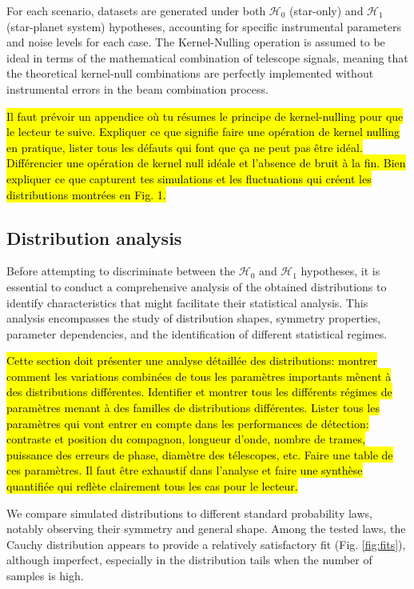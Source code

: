 \documentclass{article}
\begin{document}
For each scenario, datasets are generated under both ${\mathcal{H}}_0$ (star-only) and ${\mathcal{H}}_1$ (star-planet system) hypotheses, accounting for specific instrumental parameters and noise levels for each case. The Kernel-Nulling operation is assumed to be ideal in terms of the mathematical combination of telescope signals, meaning that the theoretical kernel-null combinations are perfectly implemented without instrumental errors in the beam combination process.

\hl{Il faut prévoir un appendice où tu résumes le principe de kernel-nulling pour que le lecteur te suive. Expliquer ce que signifie faire une opération de kernel nulling en pratique, lister tous les défauts qui font que ça ne peut pas être idéal. Différencier une opération de kernel null idéale et l'absence de bruit à la fin. Bien expliquer ce que capturent tes simulations et les fluctuations qui créent les distributions montrées en Fig. 1.}

\subsection{Distribution analysis}  \label{sec:distribution_analysis}

Before attempting to discriminate between the ${\mathcal{H}}_0$ and ${\mathcal{H}}_1$ hypotheses, it is essential to conduct a comprehensive analysis of the obtained distributions to identify characteristics that might facilitate their statistical analysis. This analysis encompasses the study of distribution shapes, symmetry properties, parameter dependencies, and the identification of different statistical regimes.

\hl{Cette section doit présenter une analyse détaillée des distributions: montrer comment les variations combinées de tous les paramètres importants mènent à des distributions différentes. Identifier et montrer tous les différents régimes de paramètres menant à des familles de distributions différentes. Lister tous les paramètres qui vont entrer en compte dans les performances de détection: contraste et position du compagnon, longueur d'onde, nombre de trames, puissance des erreurs de phase, diamètre des télescopes, etc. Faire une table de ces paramètres. Il faut être exhaustif dans l'analyse et faire une synthèse quantifiée qui reflète clairement tous les cas pour le lecteur.}

We compare simulated distributions to different standard probability laws, notably observing their symmetry and general shape. Among the tested laws, the Cauchy distribution appears to provide a relatively satisfactory fit (Fig. \ref{fig:fits}), although imperfect, especially in the distribution tails when the number of samples is high.
\end{document}
